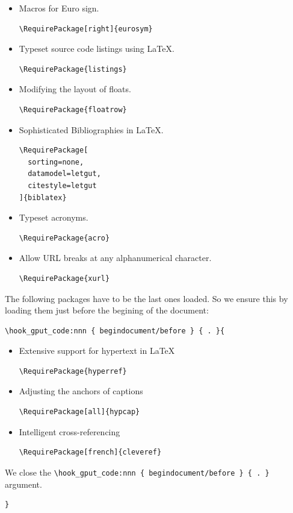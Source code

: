 \documentclass{letgut}
\begin{document}
\begin{itemize}
\begin{lstlisting}
\end{lstlisting}
\item Macros for Euro sign.
\begin{lstlisting}
\RequirePackage[right]{eurosym}
\end{lstlisting}
\item Typeset source code listings using \LaTeX{}.
\begin{lstlisting}
\RequirePackage{listings}
\end{lstlisting}
\item Modifying the layout of floats.
\begin{lstlisting}
\RequirePackage{floatrow}
\end{lstlisting}
\item Sophisticated Bibliographies in \LaTeX{}.
\begin{lstlisting}
\RequirePackage[
  sorting=none,
  datamodel=letgut,
  citestyle=letgut
]{biblatex}
\end{lstlisting}
\item Typeset acronyms.
\begin{lstlisting}
\RequirePackage{acro}
\end{lstlisting}
\item Allow URL breaks at any alphanumerical character.
\begin{lstlisting}
\RequirePackage{xurl}
\end{lstlisting}
\end{itemize}

The following packages have to be the last ones loaded. So we ensure this by
loading them just before the begining of the document:
\begin{lstlisting}
\hook_gput_code:nnn { begindocument/before } { . }{
\end{lstlisting}
\begin{itemize}
\item Extensive support for hypertext in \LaTeX{}
\begin{lstlisting}
\RequirePackage{hyperref}
\end{lstlisting}
\item Adjusting the anchors of captions
\begin{lstlisting}
\RequirePackage[all]{hypcap}
\end{lstlisting}
\item Intelligent cross-referencing
\begin{lstlisting}
\RequirePackage[french]{cleveref}
\end{lstlisting}
\end{itemize}
We close the \lstinline+\hook_gput_code:nnn { begindocument/before } { . }+ argument.
\begin{lstlisting}
}
\end{lstlisting}
\end{document}
